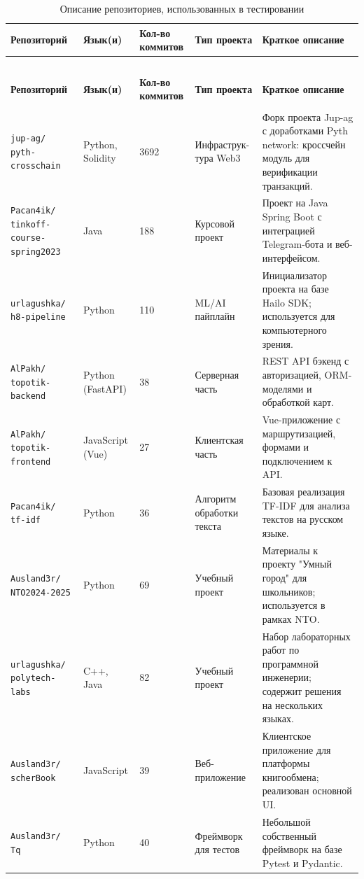 \begin{longtable}{|p{3.5cm}|p{2.2cm}|p{2cm}|p{3cm}|p{4.5cm}|}
	\caption{Описание репозиториев, использованных в тестировании}
	\label{tab:test_repos} \\
	\hline
	\textbf{Репозиторий} & \textbf{Язык(и)} & \textbf{Кол-во коммитов} & \textbf{Тип проекта} & \textbf{Краткое описание} \\
	\hline
	\endfirsthead
	
	\multicolumn{5}{c}{{\tablename\ \thetable{}}} \\
	\hline
	\textbf{Репозиторий} & \textbf{Язык(и)} & \textbf{Кол-во коммитов} & \textbf{Тип проекта} & \textbf{Краткое описание} \\
	\hline
	\endhead
	
	\hline \multicolumn{5}{r}{{}} \\
	\endfoot
	
	\hline
	\endlastfoot
	
	\texttt{jup-ag/
		pyth-
		crosschain} & Python, Solidity & 3692 & Инфраструк-
		тура Web3 & Форк проекта Jup-ag с доработками Pyth network: кроссчейн модуль для верификации транзакций. \\
	\hline
	\texttt{Pacan4ik/
		tinkoff-course-
		spring2023} & Java & 188 & Курсовой проект & Проект на Java Spring Boot с интеграцией Telegram-бота и веб-интерфейсом. \\
	\hline
	\texttt{urlagushka/
		h8-pipeline} & Python & 110 & ML/AI пайплайн & Инициализатор проекта на базе Hailo SDK; используется для компьютерного зрения. \\
	\hline
	\texttt{AlPakh/
		topotik-
		backend} & Python (FastAPI) & 38 & Серверная часть & REST API бэкенд с авторизацией, ORM-моделями и обработкой карт. \\
	\hline
	\texttt{AlPakh/
		topotik-
		frontend} & JavaScript (Vue) & 27 & Клиентская часть & Vue-приложение с маршрутизацией, формами и подключением к API. \\
	\hline
	\texttt{Pacan4ik/
		tf-idf} & Python & 36 & Алгоритм обработки текста & Базовая реализация TF-IDF для анализа текстов на русском языке. \\
	\hline
	\texttt{Ausland3r/
		NTO2024-2025} & Python & 69 & Учебный проект & Материалы к проекту "Умный город" для школьников; используется в рамках NTO. \\
	\hline
	\texttt{urlagushka/
		polytech-labs} & C++, Java & 82 & Учебный проект & Набор лабораторных работ по программной инженерии; содержит решения на нескольких языках. \\
	\hline
	\texttt{Ausland3r/
		scherBook} & JavaScript & 39 & Веб-приложение & Клиентское приложение для платформы книгообмена; реализован основной UI. \\
	\hline
	\texttt{Ausland3r/
		Tq} & Python & 40 & Фреймворк для тестов & Небольшой собственный фреймворк на базе Pytest и Pydantic. \\
\end{longtable}

